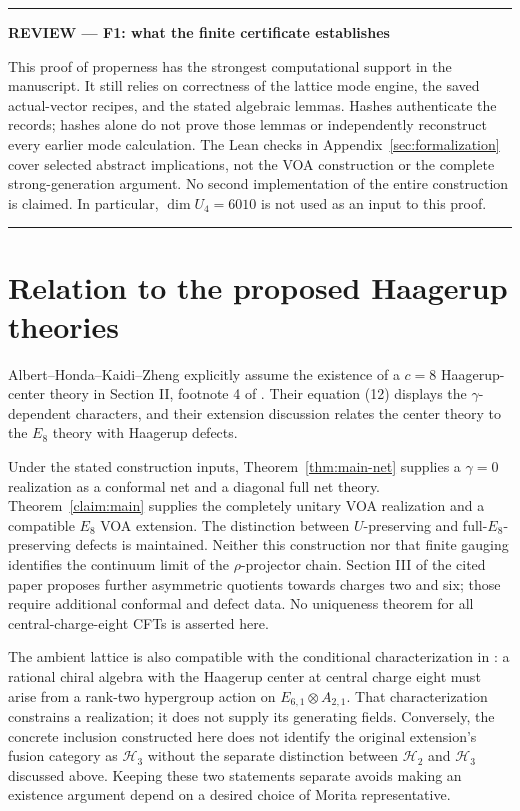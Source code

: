 \documentclass[11pt,a4paper]{article}
\theoremstyle{definition}
\newcommand{\HH}{\mathcal H}
\newenvironment{reviewnote}[1]{\par\addvspace{8pt}\begingroup
  \color{Sepia}\noindent\rule{\linewidth}{0.7pt}\par\nobreak
  \noindent\textbf{REVIEW --- #1}\par\nobreak\small\noindent\ignorespaces
}{\par\noindent\rule{\linewidth}{0.7pt}\par\endgroup\addvspace{8pt}}
\begin{document}
\begin{reviewnote}{F1: what the finite certificate establishes}
This proof of properness has the strongest computational support in the
manuscript. It still relies on correctness of the lattice mode engine,
the saved actual-vector recipes, and the stated algebraic lemmas.
Hashes authenticate the records; hashes alone do not prove those lemmas
or independently reconstruct every earlier mode calculation. The Lean
checks in Appendix~\ref{sec:formalization} cover selected abstract
implications, not the VOA construction or the complete strong-generation
argument. No second implementation of the entire construction is
claimed. In particular, \(\dim U_4=6010\) is not used as an input to
this proof.
\end{reviewnote}




\section{Relation to the proposed Haagerup theories}\label{sec:comparison}
Albert--Honda--Kaidi--Zheng explicitly assume the existence of a
\(c=8\) Haagerup-center theory in Section II, footnote 4 of
\cite{AHKZ}.
Their equation (12) displays the \(\gamma\)-dependent characters,
and their extension discussion relates the center theory to the
\(E_8\) theory with Haagerup defects.

Under the stated construction inputs, Theorem~\ref{thm:main-net}
supplies a $\gamma=0$ realization as a conformal net and a diagonal
full net theory. Theorem~\ref{claim:main} supplies the completely unitary VOA
realization and a compatible $E_8$ VOA extension. The distinction
between $U$-preserving and full-$E_8$-preserving defects is maintained.
Neither this construction
nor that finite gauging identifies the continuum limit of the
\(\rho\)-projector chain. Section III of the cited paper proposes
further asymmetric quotients towards charges two and six; those require
additional conformal and defect data. No uniqueness theorem for all
central-charge-eight CFTs is asserted here.

The ambient lattice is also compatible with the conditional
characterization in \cite[Section 4.3]{GR}: a rational chiral algebra
with the Haagerup center at central charge eight must arise from a
rank-two hypergroup action on $E_{6,1}\otimes A_{2,1}$. That
characterization constrains a realization; it does not supply its
generating fields. Conversely, the concrete inclusion constructed here
does not identify the original extension's fusion category as $\HH_3$
without the separate distinction between $\HH_2$ and $\HH_3$ discussed
above. Keeping these two statements separate avoids making an
existence argument depend on a desired choice of Morita representative.
\end{document}
